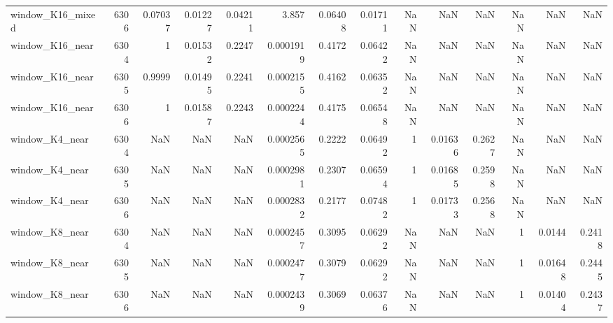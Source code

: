 \begin{table}
\begin{tabular}{lrrrrrrrrrrrrr}
window\_K16\_mixed & 6306 & 0.07037 & 0.01227 & 0.04211 & 3.857 & 0.06408 & 0.01711 & NaN & NaN & NaN & NaN & NaN & NaN \\
window\_K16\_near & 6304 & 1 & 0.01532 & 0.2247 & 0.0001919 & 0.4172 & 0.06422 & NaN & NaN & NaN & NaN & NaN & NaN \\
window\_K16\_near & 6305 & 0.9999 & 0.01495 & 0.2241 & 0.0002155 & 0.4162 & 0.06352 & NaN & NaN & NaN & NaN & NaN & NaN \\
window\_K16\_near & 6306 & 1 & 0.01587 & 0.2243 & 0.0002244 & 0.4175 & 0.06548 & NaN & NaN & NaN & NaN & NaN & NaN \\
window\_K4\_near & 6304 & NaN & NaN & NaN & 0.0002565 & 0.2222 & 0.06492 & 1 & 0.01636 & 0.2627 & NaN & NaN & NaN \\
window\_K4\_near & 6305 & NaN & NaN & NaN & 0.0002981 & 0.2307 & 0.06594 & 1 & 0.01685 & 0.2598 & NaN & NaN & NaN \\
window\_K4\_near & 6306 & NaN & NaN & NaN & 0.0002832 & 0.2177 & 0.07482 & 1 & 0.01733 & 0.2568 & NaN & NaN & NaN \\
window\_K8\_near & 6304 & NaN & NaN & NaN & 0.0002457 & 0.3095 & 0.06292 & NaN & NaN & NaN & 1 & 0.0144 & 0.2418 \\
window\_K8\_near & 6305 & NaN & NaN & NaN & 0.0002477 & 0.3079 & 0.06292 & NaN & NaN & NaN & 1 & 0.01648 & 0.2445 \\
window\_K8\_near & 6306 & NaN & NaN & NaN & 0.0002439 & 0.3069 & 0.06376 & NaN & NaN & NaN & 1 & 0.01404 & 0.2437 \\
\bottomrule
\end{tabular}
\end{table}
